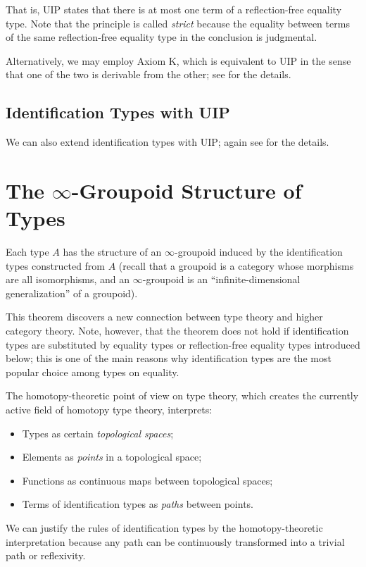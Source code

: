 \documentclass[11pt]{article}
\begin{document}
\begin{prooftree*}
\end{prooftree*}

That is, UIP states that there is at most one term of a reflection-free equality type.
Note that the principle is called \emph{strict} because the equality between terms of the same reflection-free equality type in the conclusion is judgmental. 

Alternatively, we may employ Axiom K, which is equivalent to UIP in the sense that one of the two is derivable from the other; see \cite{hott-as:book} for the details. 

\subsection{Identification Types with UIP}

We can also extend identification types with UIP; again see \cite{hott-as:book} for the details. 

\section{The $\infty$-Groupoid Structure of Types}

\begin{theorem}
Each type $A$ has the structure of an $\infty$-groupoid induced by the identification types constructed from $A$ (recall that a groupoid is a category whose morphisms are all isomorphisms, and an $\infty$-groupoid is an ``infinite-dimensional generalization'' of a groupoid).
\end{theorem}

This theorem discovers a new connection between type theory and higher category theory. Note, however, that the theorem does not hold if identification types are substituted by equality types or reflection-free equality types introduced below; this is one of the main reasons why identification types are the most popular choice among types on equality.

The homotopy-theoretic point of view on type theory, which creates the currently active field of homotopy type theory, interprets:

\begin{itemize}
\item Types as certain \emph{topological spaces};
\item Elements as \emph{points} in a topological space;
\item Functions as continuous maps between topological spaces;
\item Terms of identification types as \emph{paths} between points. 
\end{itemize}

We can justify the rules of identification types by the homotopy-theoretic interpretation because any path can be continuously transformed into a trivial path or reflexivity.

\printbibliography
\end{document}

